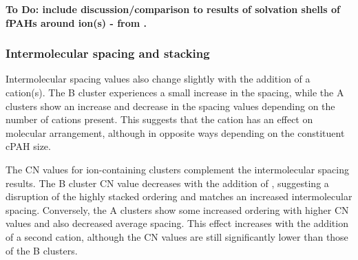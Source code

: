 \textbf{To Do: include discussion/comparison to results of solvation shells of fPAHs around ion(s) - from \cite{bowal2019ion,bartolomei2019aggregation}.}

\subsubsection{Intermolecular spacing and stacking}
Intermolecular spacing values also change slightly with the addition of a cation(s). The B cluster experiences a small increase in the spacing, while the A clusters show an increase and decrease in the spacing values depending on the number of cations present. This suggests that the cation has an effect on molecular arrangement, although in opposite ways depending on the constituent cPAH size. %

The CN values for ion-containing clusters complement the intermolecular spacing results. The B cluster CN value decreases with the addition of , suggesting a disruption of the highly stacked ordering and matches an increased intermolecular spacing. Conversely, the A clusters show some increased ordering with higher CN values and also decreased average spacing. This effect increases with the addition of a second cation, although the CN values are still significantly lower than those of the B clusters.

